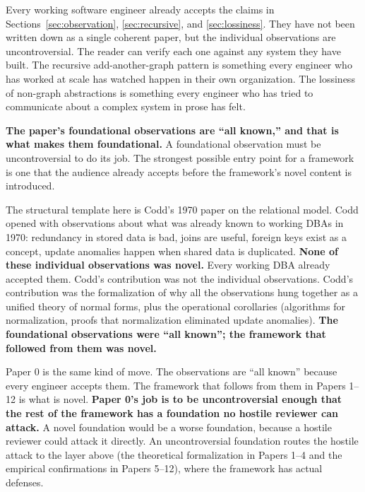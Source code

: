 \documentclass[11pt]{article}
\begin{document}
Every working software engineer already accepts the claims in Sections~\ref{sec:observation}, \ref{sec:recursive}, and \ref{sec:lossiness}. They have not been written down as a single coherent paper, but the individual observations are uncontroversial. The reader can verify each one against any system they have built. The recursive add-another-graph pattern is something every engineer who has worked at scale has watched happen in their own organization. The lossiness of non-graph abstractions is something every engineer who has tried to communicate about a complex system in prose has felt.

\textbf{The paper's foundational observations are ``all known,'' and that is what makes them foundational.} A foundational observation must be uncontroversial to do its job. The strongest possible entry point for a framework is one that the audience already accepts before the framework's novel content is introduced.

The structural template here is Codd's 1970 paper on the relational model. Codd opened with observations about what was already known to working DBAs in 1970: redundancy in stored data is bad, joins are useful, foreign keys exist as a concept, update anomalies happen when shared data is duplicated. \textbf{None of these individual observations was novel.} Every working DBA already accepted them. Codd's contribution was not the individual observations. Codd's contribution was the formalization of why all the observations hung together as a unified theory of normal forms, plus the operational corollaries (algorithms for normalization, proofs that normalization eliminated update anomalies). \textbf{The foundational observations were ``all known''; the framework that followed from them was novel.}

Paper 0 is the same kind of move. The observations are ``all known'' because every engineer accepts them. The framework that follows from them in Papers 1--12 is what is novel. \textbf{Paper 0's job is to be uncontroversial enough that the rest of the framework has a foundation no hostile reviewer can attack.} A novel foundation would be a worse foundation, because a hostile reviewer could attack it directly. An uncontroversial foundation routes the hostile attack to the layer above (the theoretical formalization in Papers 1--4 and the empirical confirmations in Papers 5--12), where the framework has actual defenses.
\end{document}
